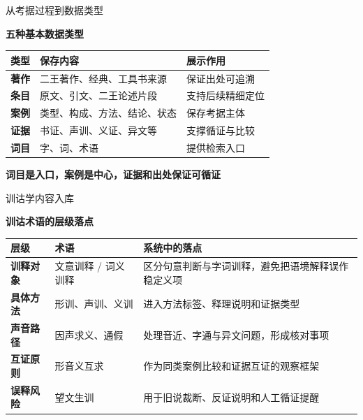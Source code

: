\documentclass[aspectratio=169]{beamer}
\newcommand{\key}[1]{\textcolor{rucRed}{\textbf{#1}}}
\begin{document}
\begin{frame}{从考据过程到数据类型}
    \begin{center}
        \small\textbf{五种基本数据类型}
    \end{center}
    \vspace{-0.18cm}
    \begin{table}[h]
        \centering
        \small
        \begin{tabularx}{\textwidth}{>{\bfseries}l X X}
            \toprule
            类型 & 保存内容 & 展示作用 \\
            \midrule
            著作 & 二王著作、经典、工具书来源 & 保证出处可追溯 \\
            条目 & 原文、引文、二王论述片段 & 支持后续精细定位 \\
            案例 & 类型、构成、方法、结论、状态 & 保存考据主体 \\
            证据 & 书证、声训、义证、异文等 & 支撑循证与比较 \\
            词目 & 字、词、术语 & 提供检索入口 \\
            \bottomrule
        \end{tabularx}
    \end{table}
    \begin{center}
        \key{词目是入口，案例是中心，证据和出处保证可循证}
    \end{center}
\end{frame}

\begin{frame}{训诂学内容入库}
    \begin{center}
        \small\textbf{训诂术语的层级落点}
    \end{center}
    \vspace{-0.24cm}
    \begin{table}[h]
        \centering
        \small
        \begin{tabularx}{0.96\textwidth}{>{\bfseries}p{} p{} X}
            \toprule
            层级 & 术语 & 系统中的落点 \\
            \midrule
            训释对象 & 文意训释 / 词义训释 & 区分句意判断与字词训释，避免把语境解释误作稳定义项 \\
            具体方法 & 形训、声训、义训 & 进入方法标签、释理说明和证据类型 \\
            声音路径 & 因声求义、通假 & 处理音近、字通与异文问题，形成核对事项 \\
            互证原则 & 形音义互求 & 作为同类案例比较和证据互证的观察框架 \\
            误释风险 & 望文生训 & 用于旧说裁断、反证说明和人工循证提醒 \\
            \bottomrule
        \end{tabularx}
    \end{table}
\end{frame}
\end{document}
